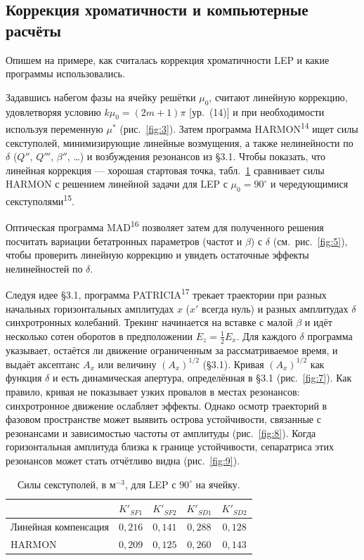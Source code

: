 \documentclass[11pt,a4paper]{article}
\begin{document}
\subsection{Коррекция хроматичности и компьютерные расчёты}

Опишем на примере, как считалась коррекция хроматичности LEP и какие программы
использовались.

Задавшись набегом фазы на ячейку решётки $\mu_0$, считают линейную коррекцию,
удовлетворяя условию $k\mu_0=(2m+1)\pi$ [ур.~(14)] и при необходимости используя
переменную $\mu^*$ (рис.~\ref{fig:3}). Затем программа HARMON\textsuperscript{14}
ищет силы секступолей, минимизирующие линейные возмущения, а также нелинейности
по $\delta$ ($Q''$, $Q'''$, $\beta''$, \ldots) и возбуждения резонансов из §3.1.
Чтобы показать, что линейная коррекция --- хорошая стартовая точка,
табл.~\ref{tab:II} сравнивает силы HARMON с решением линейной задачи для LEP с
$\mu_0=90^\circ$ и чередующимися секступолями\textsuperscript{15}.

Оптическая программа MAD\textsuperscript{16} позволяет затем для полученного
решения посчитать вариации бетатронных параметров (частот и $\beta$) с $\delta$
(см.\ рис.~\ref{fig:5}), чтобы проверить линейную коррекцию и увидеть остаточные
эффекты нелинейностей по $\delta$.

Следуя идее §3.1, программа PATRICIA\textsuperscript{17} трекает траектории при
разных начальных горизонтальных амплитудах $x$ ($x'$ всегда нуль) и разных
амплитудах $\delta$ синхротронных колебаний. Трекинг начинается на вставке с
малой $\beta$ и идёт несколько сотен оборотов в предположении
$E_z=\tfrac12 E_x$. Для каждого $\delta$ программа указывает, остаётся ли
движение ограниченным за рассматриваемое время, и выдаёт аксептанс $A_x$ или
величину $(A_x)^{1/2}$ (§3.1). Кривая $(A_x)^{1/2}$ как функция $\delta$ и есть
динамическая апертура, определённая в §3.1 (рис.~\ref{fig:7}). Как правило,
кривая не показывает узких провалов в местах резонансов: синхротронное движение
ослабляет эффекты. Однако осмотр траекторий в фазовом пространстве может выявить
острова устойчивости, связанные с резонансами и зависимостью частоты от
амплитуды (рис.~\ref{fig:8}). Когда горизонтальная амплитуда близка к границе
устойчивости, сепаратриса этих резонансов может стать отчётливо видна
(рис.~\ref{fig:9}).

\begin{table}[H]
\centering
\caption{Силы секступолей, в м$^{-3}$, для LEP с $90^\circ$ на ячейку.}
\label{tab:II}
\begin{tabular}{@{}lcccc@{}}
\toprule
 & $K'_{SF1}$ & $K'_{SF2}$ & $K'_{SD1}$ & $K'_{SD2}$ \\
\midrule
Линейная компенсация & $0{,}216$ & $0{,}141$ & $0{,}288$ & $0{,}128$ \\
HARMON & $0{,}209$ & $0{,}125$ & $0{,}260$ & $0{,}143$ \\
\bottomrule
\end{tabular}
\end{table}
\end{document}

